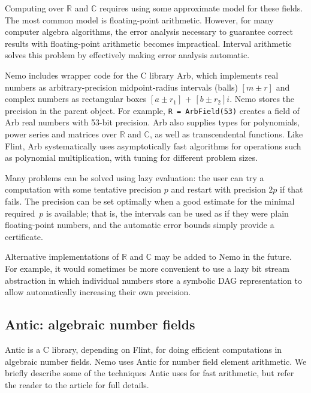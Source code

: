 \documentclass{sig-alternate-05-2015}
\begin{document}
Computing over $\mathbb{R}$ and $\mathbb{C}$ requires
using some approximate model for these fields.
The most common model is floating-point arithmetic.
However, for many computer algebra algorithms,
the error analysis necessary to guarantee correct
results with floating-point arithmetic
becomes impractical.
Interval arithmetic solves this problem by effectively making
error analysis automatic.

Nemo includes wrapper code for the C library Arb, which implements real numbers as
arbitrary-precision midpoint-radius intervals (balls) $[m \pm r]$
and complex numbers as rectangular boxes $[a \pm r_1]$ + $[b \pm r_2] i$.
Nemo stores the precision in the parent object.
For example, \texttt{R = ArbField(53)}
creates a field of Arb real numbers with 53-bit precision.
Arb also supplies types for polynomials, power series and matrices
over $\mathbb{R}$ and $\mathbb{C}$, as well as transcendental functions.
Like Flint, Arb systematically uses asymptotically fast algorithms
for operations such as polynomial multiplication, with tuning
for different problem sizes.

Many problems can be solved using lazy evaluation: the user can
try a computation with some tentative precision $p$ and restart
with precision $2p$ if that fails. The precision can be set
optimally when a good estimate for the minimal
required~$p$ is available; that is, the intervals
can be used as if they were plain floating-point numbers, and the automatic
error bounds simply provide a certificate.

Alternative implementations of $\mathbb{R}$ and $\mathbb{C}$
may be added to Nemo in the future.
For example, it would sometimes be more convenient to use a lazy
bit stream abstraction in which individual numbers
store a symbolic DAG representation to allow automatically
increasing their own precision.


\subsection{Antic: algebraic number fields}

Antic is a C library, depending on Flint, for
doing efficient computations in algebraic number fields. 
Nemo uses Antic for number field element arithmetic. We briefly describe some
of the techniques Antic uses for fast arithmetic, but
refer the reader to the article \cite{antic} for full details.
\end{document}
